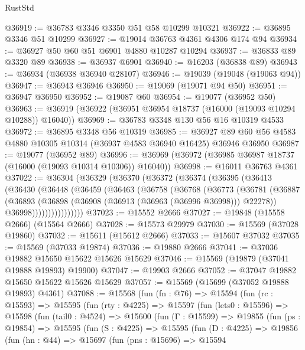 \begin{lexlean}{RustStd}
\begin{coremodule}
@36919 := @36783 @3346 @3350 @51 @58 @10299 @10321
@36922 := @36895 @3346 @51 @10299
@36927 := @19014 @36763 @4361 @4306 @174 @94
@36934 := @36927 @50 @60 @51 @6901 @4880 @10287 @10294
@36937 := @36833 @89 @3320 @89
@36938 := @36937 @6901
@36940 := @16203 (@36838 @89)
@36943 := @36934 (@36938 @36940 @28107)
@36946 := @19039 (@19048 (@19063 @94))
@36947 := @36943 @36946
@36950 := @19069 (@19071 @94 @50)
@36951 := @36947 @36950
@36952 := @19087 @60
@36954 := @19077 (@36952 @50)
@36963 := @36919 (@36922 (@36951 @36954 @18737 (@16000 (@19093 @10294 @10288)) @16040))
@36969 := @36783 @3348 @130 @56 @16 @10319 @4533
@36972 := @36895 @3348 @56 @10319
@36985 := @36927 @89 @60 @56 @4583 @4880 @10305 @10314 (@36937 @4583 @36940 @16425) @36946 @36950
@36987 := @19077 (@36952 @89)
@36996 := @36969 (@36972 (@36985 @36987 @18737 (@16000 (@19093 @10314 @10306)) @16040))
@36998 := @16011 @36763 @4361
@37022 := @36304
    (@36329
      (@36370
        (@36372
          (@36374
            (@36395
              (@36413
                (@36430
                  (@36448
                    (@36459
                      (@36463
                        (@36758
                          (@36768
                            (@36773
                              (@36781
                                (@36887
                                  (@36893
                                    (@36898 (@36908 (@36913 (@36963 (@36996 @36998))) @22278))
                                    @36998))))))))))))))))
@37023 := @15552 @2666
@37027 := @19848 (@15558 @2666) (@15564 @2666)
@37028 := @15573 @29979
@37030 := @15569 (@37028 @19860)
@37032 := @15611 (@15612 @2666)
@37033 := @15607 @37032
@37035 := @15569 (@37033 @19874)
@37036 := @19880 @2666
@37041 := @37036 @19882 @15650 @15622 @15626 @15629
@37046 := @15569 (@19879 (@37041 @19888 @19893) @19900)
@37047 := @19903 @2666
@37052 := @37047 @19882 @15650 @15622 @15626 @15629
@37057 := @15569 (@15699 (@37052 @19888 @19893) @4361)
@37088 := @15568
    (fun (fn : @76) =>
    @15594
      (fun (rc : @15593) =>
      @15595
        (fun (rty : @4225) =>
        @15597
          (fun (lets0 : @15596) =>
          @15598
            (fun (tail0 : @4524) =>
            @15600
              (fun (Γ : @15599) =>
              @19855
                (fun (ps : @19854) =>
                @15595
                  (fun (S : @4225) =>
                  @15595
                    (fun (D : @4225) =>
                    @19856
                      (fun (hn : @44) =>
                      @15697
                        (fun (pns : @15696) =>
                        @15594

\end{coremodule}
\end{lexlean}

